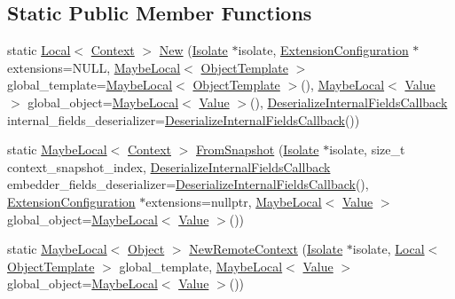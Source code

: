 \subsection*{Static Public Member Functions}
\begin{DoxyCompactItemize}
\item 
static \mbox{\hyperlink{classv8_1_1Local}{Local}}$<$ \mbox{\hyperlink{classv8_1_1Context}{Context}} $>$ \mbox{\hyperlink{classv8_1_1Context_adca49dc82992b2867edefebed0c4ac6b}{New}} (\mbox{\hyperlink{classv8_1_1Isolate}{Isolate}} $\ast$isolate, \mbox{\hyperlink{classv8_1_1ExtensionConfiguration}{Extension\+Configuration}} $\ast$extensions=N\+U\+LL, \mbox{\hyperlink{classv8_1_1MaybeLocal}{Maybe\+Local}}$<$ \mbox{\hyperlink{classv8_1_1ObjectTemplate}{Object\+Template}} $>$ global\+\_\+template=\mbox{\hyperlink{classv8_1_1MaybeLocal}{Maybe\+Local}}$<$ \mbox{\hyperlink{classv8_1_1ObjectTemplate}{Object\+Template}} $>$(), \mbox{\hyperlink{classv8_1_1MaybeLocal}{Maybe\+Local}}$<$ \mbox{\hyperlink{classv8_1_1Value}{Value}} $>$ global\+\_\+object=\mbox{\hyperlink{classv8_1_1MaybeLocal}{Maybe\+Local}}$<$ \mbox{\hyperlink{classv8_1_1Value}{Value}} $>$(), \mbox{\hyperlink{structv8_1_1DeserializeInternalFieldsCallback}{Deserialize\+Internal\+Fields\+Callback}} internal\+\_\+fields\+\_\+deserializer=\mbox{\hyperlink{structv8_1_1DeserializeInternalFieldsCallback}{Deserialize\+Internal\+Fields\+Callback}}())
\item 
static \mbox{\hyperlink{classv8_1_1MaybeLocal}{Maybe\+Local}}$<$ \mbox{\hyperlink{classv8_1_1Context}{Context}} $>$ \mbox{\hyperlink{classv8_1_1Context_a49a8fb02c04b6ebf4e532755d50d2ff9}{From\+Snapshot}} (\mbox{\hyperlink{classv8_1_1Isolate}{Isolate}} $\ast$isolate, size\+\_\+t context\+\_\+snapshot\+\_\+index, \mbox{\hyperlink{structv8_1_1DeserializeInternalFieldsCallback}{Deserialize\+Internal\+Fields\+Callback}} embedder\+\_\+fields\+\_\+deserializer=\mbox{\hyperlink{structv8_1_1DeserializeInternalFieldsCallback}{Deserialize\+Internal\+Fields\+Callback}}(), \mbox{\hyperlink{classv8_1_1ExtensionConfiguration}{Extension\+Configuration}} $\ast$extensions=nullptr, \mbox{\hyperlink{classv8_1_1MaybeLocal}{Maybe\+Local}}$<$ \mbox{\hyperlink{classv8_1_1Value}{Value}} $>$ global\+\_\+object=\mbox{\hyperlink{classv8_1_1MaybeLocal}{Maybe\+Local}}$<$ \mbox{\hyperlink{classv8_1_1Value}{Value}} $>$())
\item 
static \mbox{\hyperlink{classv8_1_1MaybeLocal}{Maybe\+Local}}$<$ \mbox{\hyperlink{classv8_1_1Object}{Object}} $>$ \mbox{\hyperlink{classv8_1_1Context_a3227e740cb2e611c6706e0a65bc34d10}{New\+Remote\+Context}} (\mbox{\hyperlink{classv8_1_1Isolate}{Isolate}} $\ast$isolate, \mbox{\hyperlink{classv8_1_1Local}{Local}}$<$ \mbox{\hyperlink{classv8_1_1ObjectTemplate}{Object\+Template}} $>$ global\+\_\+template, \mbox{\hyperlink{classv8_1_1MaybeLocal}{Maybe\+Local}}$<$ \mbox{\hyperlink{classv8_1_1Value}{Value}} $>$ global\+\_\+object=\mbox{\hyperlink{classv8_1_1MaybeLocal}{Maybe\+Local}}$<$ \mbox{\hyperlink{classv8_1_1Value}{Value}} $>$())
\end{DoxyCompactItemize}
